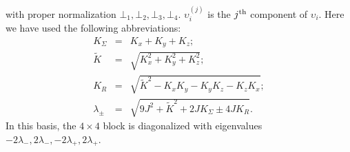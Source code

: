 \documentclass[aps,amsmath,twocolumn,amssymb,floatfix,showpacs,superscriptaddress,nofootinbib,longbibliography]{revtex4-1}
\begin{document}
with proper normalization $\bot_1,\bot_2,\bot_3,\bot_4$. $\upsilon_i^{(j)}$ is the $j^{\rm th}$ component of $\upsilon_i$. Here we have used the following abbreviations:
\begin{eqnarray}
K_{\Sigma}&=&K_x+K_y+K_z;\\
\tilde{K}&=&\sqrt{K_x^2+K_y^2+K_z^2};\\
K_R&=&\sqrt{\tilde{K}^2-K_xK_y-K_yK_z-K_zK_x};\\
\lambda_{\pm}&=&\sqrt{9J^2+\tilde{K}^2+2JK_{\Sigma}\pm4JK_R}.
\end{eqnarray}
In this basis, the $4\times4$ block is diagonalized with eigenvalues $-2\lambda_{-},2\lambda_{-},-2\lambda_{+},2\lambda_{+}$.

\end{document}
